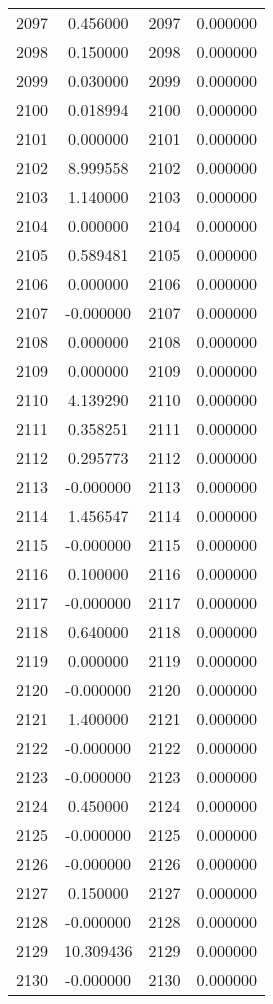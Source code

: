 \documentclass[12pt]{article}
\begin{document}
\begin{longtable}{@{}cccc@{}}
2097 & 0.456000 & 2097 & 0.000000 \\
2098 & 0.150000 & 2098 & 0.000000 \\
2099 & 0.030000 & 2099 & 0.000000 \\
2100 & 0.018994 & 2100 & 0.000000 \\
2101 & 0.000000 & 2101 & 0.000000 \\
2102 & 8.999558 & 2102 & 0.000000 \\
2103 & 1.140000 & 2103 & 0.000000 \\
2104 & 0.000000 & 2104 & 0.000000 \\
2105 & 0.589481 & 2105 & 0.000000 \\
2106 & 0.000000 & 2106 & 0.000000 \\
2107 & -0.000000 & 2107 & 0.000000 \\
2108 & 0.000000 & 2108 & 0.000000 \\
2109 & 0.000000 & 2109 & 0.000000 \\
2110 & 4.139290 & 2110 & 0.000000 \\
2111 & 0.358251 & 2111 & 0.000000 \\
2112 & 0.295773 & 2112 & 0.000000 \\
2113 & -0.000000 & 2113 & 0.000000 \\
2114 & 1.456547 & 2114 & 0.000000 \\
2115 & -0.000000 & 2115 & 0.000000 \\
2116 & 0.100000 & 2116 & 0.000000 \\
2117 & -0.000000 & 2117 & 0.000000 \\
2118 & 0.640000 & 2118 & 0.000000 \\
2119 & 0.000000 & 2119 & 0.000000 \\
2120 & -0.000000 & 2120 & 0.000000 \\
2121 & 1.400000 & 2121 & 0.000000 \\
2122 & -0.000000 & 2122 & 0.000000 \\
2123 & -0.000000 & 2123 & 0.000000 \\
2124 & 0.450000 & 2124 & 0.000000 \\
2125 & -0.000000 & 2125 & 0.000000 \\
2126 & -0.000000 & 2126 & 0.000000 \\
2127 & 0.150000 & 2127 & 0.000000 \\
2128 & -0.000000 & 2128 & 0.000000 \\
2129 & 10.309436 & 2129 & 0.000000 \\
2130 & -0.000000 & 2130 & 0.000000 \\

\end{longtable}
\end{document}
